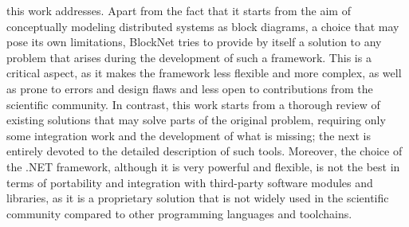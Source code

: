 this work addresses. Apart from the fact that it starts from the aim of conceptually modeling distributed systems as block diagrams, a choice that may pose its own limitations, BlockNet tries to provide by itself a solution to any problem that arises during the development of such a framework. This is a critical aspect, as it makes the framework less flexible and more complex, as well as prone to errors and design flaws and less open to contributions from the scientific community. In contrast, this work starts from a thorough review of existing solutions that may solve parts of the original problem, requiring only some integration work and the development of what is missing; the next  is entirely devoted to the detailed description of such tools. Moreover, the choice of the .NET framework, although it is very powerful and flexible, is not the best in terms of portability and integration with third-party software modules and libraries, as it is a proprietary solution that is not widely used in the scientific community compared to other programming languages and toolchains.

